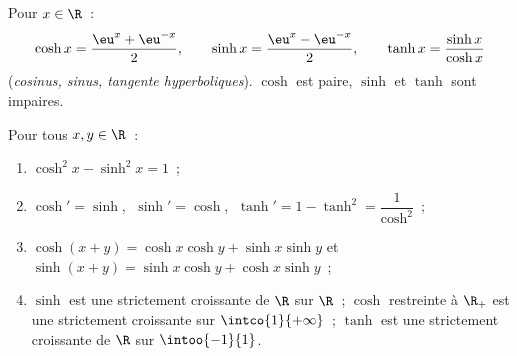\begin{definition}[$\cosh$, $\sinh$, $\tanh$]\label{def:b1:functions:hyperbolic}
Pour $x \in \R$~:
\[
\cosh x = \frac{\eu^x + \eu^{-x}}{2},
\qquad
\sinh x = \frac{\eu^x - \eu^{-x}}{2},
\qquad
\tanh x = \frac{\sinh x}{\cosh x}
\]
(\emph{cosinus, sinus, tangente hyperboliques}). $\cosh$ est paire, $\sinh$ et $\tanh$ sont impaires.
\end{definition}

\begin{proposition}\label{prop:b1:functions:hyprules}
Pour tous $x, y \in \R$~:
\begin{enumerate}
  \item $\cosh^2 x - \sinh^2 x = 1$~;
  \item $\cosh' = \sinh$, $\;\sinh' = \cosh$, $\;\tanh' = 1 - \tanh^2
        = \dfrac{1}{\cosh^2}$~;
  \item $\cosh(x+y) = \cosh x\cosh y + \sinh x \sinh y$ et
        $\sinh(x+y) = \sinh x \cosh y + \cosh x \sinh y$~;
  \item $\sinh$ est une  strictement croissante de $\R$ sur
        $\R$~; $\cosh$ restreinte à $\R_+$ est une 
        strictement croissante sur $\intco{1}{+\infty}$~; $\tanh$ est
        une  strictement croissante de $\R$ sur
        $\intoo{-1}{1}$.
\end{enumerate}
\end{proposition}

